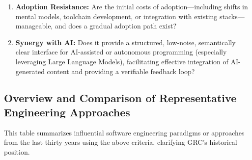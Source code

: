 \documentclass[11pt]{article}
\begin{document}
\begin{enumerate}
    \item \textbf{Adoption Resistance:} Are the initial costs of adoption---including shifts in mental models, toolchain development, or integration with existing stacks---manageable, and does a gradual adoption path exist?
    
    \item \textbf{Synergy with AI:} Does it provide a structured, low-noise, semantically clear interface for AI-assisted or autonomous programming (especially leveraging Large Language Models), facilitating effective integration of AI-generated content and providing a verifiable feedback loop?
\end{enumerate}

\subsection{Overview and Comparison of Representative Engineering Approaches}
\label{subsec:comparison}

This table summarizes influential software engineering paradigms or approaches from the last thirty years using the above criteria, clarifying GRC's historical position.
\end{document}
